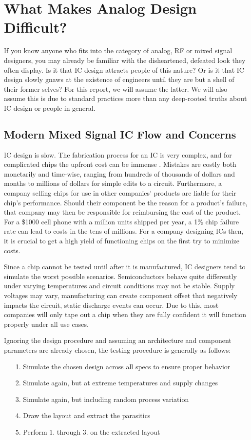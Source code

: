 \chapter{What Makes Analog Design Difficult?}

If you know anyone who fits into the category of analog, RF or mixed signal designers, you may already be familiar with the disheartened, defeated look they often display. Is it that IC design attracts people of this nature? Or is it that IC design slowly gnaws at the existence of engineers until they are but a shell of their former selves? For this report, we will assume the latter. We will also assume this is due to standard practices more than any deep-rooted truths about IC design or people in general.

\section{Modern Mixed Signal IC Flow and Concerns}
IC design is slow. The fabrication process for an IC is very complex, and for complicated chips the upfront cost can be immense \cite{elder_real_nodate}. Mistakes are costly both monetarily and time-wise, ranging from hundreds of thousands of dollars and months to millions of dollars for simple edits to a circuit. Furthermore, a company selling chips for use in other companies' products are liable for their chip's performance. Should their component be the reason for a product's failure, that company may then be responsible for reimbursing the cost of the product. For a \$1000 cell phone with a million units shipped per year, a 1\% chip failure rate can lead to costs in the tens of millions. For a company designing ICs then, it is crucial to get a high yield of functioning chips on the first try to minimize costs.

Since a chip cannot be tested until after it is manufactured, IC designers tend to simulate the worst possible scenarios. Semiconductors behave quite differently under varying temperatures and circuit conditions may not be stable. Supply voltages may vary, manufacturing can create component offset that negatively impacts the circuit, static discharge events can occur. Due to this, most companies will only tape out a chip when they are fully confident it will function properly under all use cases. 

Ignoring the design procedure and assuming an architecture and component parameters are already chosen, the testing procedure is generally as follows:
\begin{itemize}
\item[1.] Simulate the chosen design across all specs to ensure proper behavior
\item[2.] Simulate again, but at extreme temperatures and supply changes
\item[3.] Simulate again, but including random process variation
\item[4.] Draw the layout and extract the parasitics
\item[5.] Perform 1. through 3. on the extracted layout
\end{itemize}

